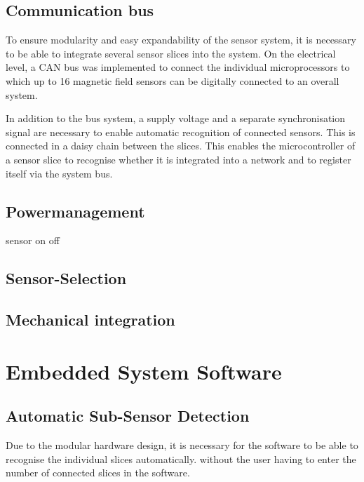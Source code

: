 \documentclass[conference]{IEEEtran}
\begin{document}
\subsection{Communication bus}

To ensure modularity and easy expandability of the sensor system, it is necessary to be able to integrate several sensor slices into the system.
On the electrical level, a CAN bus was implemented to connect the individual microprocessors to which up to 16 magnetic field sensors can be digitally connected to an overall system.

In addition to the bus system, a supply voltage and a separate synchronisation signal are necessary to enable automatic recognition of connected sensors. This is connected in a daisy chain between the slices.
This enables the microcontroller of a sensor slice to recognise whether it is integrated into a network and to register itself via the system bus.



\subsection{Powermanagement}
sensor on off

\subsection{Sensor-Selection}


\subsection{Mechanical integration}

%
\section{Embedded System Software}

\subsection{Automatic Sub-Sensor Detection}

Due to the modular hardware design, it is necessary for the software to be able to recognise the individual slices automatically.
without the user having to enter the number of connected slices in the software.
\end{document}
